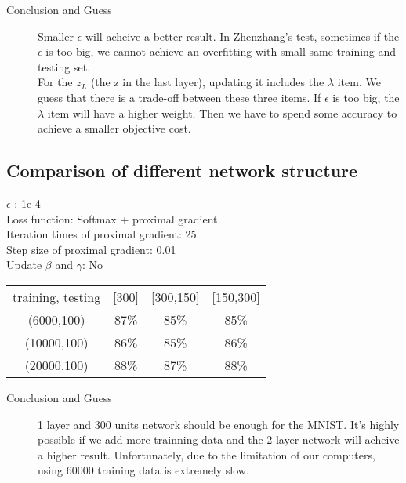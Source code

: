 \documentclass{article}
\begin{document}
\begin{description}
\item[Conclusion and Guess] Smaller $\epsilon$ will acheive a better result. In Zhenzhang's test, sometimes if the $\epsilon$ is too big, we cannot achieve an overfitting with small same training and testing set.\\
For the $z_L$ (the z in the last layer), updating it includes the $\lambda$ item. We guess that there is a trade-off between these three items. If $\epsilon$ is too big, the$\lambda$ item will have a higher weight. Then we have to spend some accuracy to achieve a smaller objective cost.
\end{description}


\subsection{Comparison of different network structure}
\begin{center}
$\epsilon$ : 1e-4\\
Loss function: Softmax + proximal gradient\\
Iteration times of proximal gradient: 25 \\
Step size of proximal gradient: 0.01 \\
Update $\beta$ and $\gamma$:  No\\
\begin{tabular}{c c c c}
	\hline
		{training, testing} & [300] & [300,150] & [150,300] \\
		(6000,100) & 87\% & 85\% & 85\% \\
		(10000,100) & 86\% & 85\% & 86\% \\
		(20000,100) & 88\% & 87\% & 88\% \\
	\hline
	\end{tabular}
\end{center}

\begin{description}
\item[Conclusion and Guess] 1 layer and 300 units network should be enough for the MNIST. It's highly possible if we add more trainning data and the 2-layer network will acheive a higher result. Unfortunately, due to the limitation of our computers, using 60000 training data is extremely slow.
\end{description}
\end{document}
